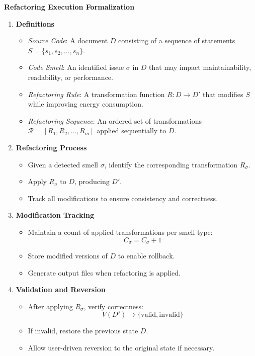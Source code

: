 \documentclass[12pt, titlepage]{article}
\begin{document}
\textbf{Refactoring Execution Formalization}
\begin{enumerate}
  \item \textbf{Definitions}
  \begin{itemize}
      \item \textit{Source Code}: A document \( D \) consisting of a sequence of statements \( S = \{ s_1, s_2, \dots, s_n \} \).
      \item \textit{Code Smell}: An identified issue \( \sigma \) in \( D \) that may impact maintainability, readability, or performance.
      \item \textit{Refactoring Rule}: A transformation function \( R: D \to D' \) that modifies \( S \) while improving energy consumption.
      \item \textit{Refactoring Sequence}: An ordered set of transformations \( \mathcal{R} = [R_1, R_2, \dots, R_m] \) applied sequentially to \( D \).
  \end{itemize}

  \item \textbf{Refactoring Process}
  \begin{itemize}
      \item Given a detected smell \( \sigma \), identify the corresponding transformation \( R_{\sigma} \).
      \item Apply \( R_{\sigma} \) to \( D \), producing \( D' \).
      \item Track all modifications to ensure consistency and correctness.
  \end{itemize}

  \item \textbf{Modification Tracking}
  \begin{itemize}
      \item Maintain a count of applied transformations per smell type:  
        \[
        C_{\sigma} = C_{\sigma} + 1
        \]
      \item Store modified versions of \( D \) to enable rollback.
      \item Generate output files when refactoring is applied.
  \end{itemize}

  \item \textbf{Validation and Reversion}
  \begin{itemize}
      \item After applying \( R_{\sigma} \), verify correctness:  
        \[
        V(D') \to \{ \text{valid}, \text{invalid} \}
        \]
      \item If invalid, restore the previous state \( D \).
      \item Allow user-driven reversion to the original state if necessary.
  \end{itemize}
\end{enumerate}
\end{document}
